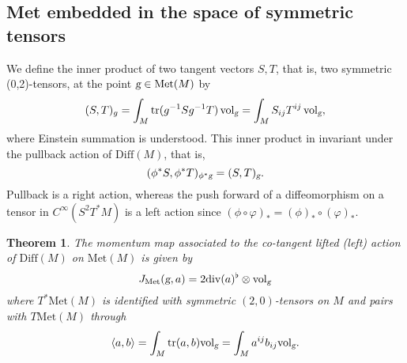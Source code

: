 \documentclass{article}
\theoremstyle{plain}
\newtheorem{teo}{Theorem}[section]
\theoremstyle{definition}
\newcommand{\g}{\ensuremath{\textsl{g}}}
\newcommand{\Diff}{\ensuremath{\mathrm{Diff}}}
\newcommand{\Met}{\ensuremath{\mathrm{Met}}}
\newcommand{\Div}{\ensuremath{\mathrm{div}}}
\newcommand{\Vol}{\ensuremath{\mathrm{vol}}}
\newcommand{\tr}{\ensuremath{\mathrm{tr}}}
\begin{document}
\subsection[Met embedded]{Met embedded in the space of symmetric tensors}
We define the inner product of two tangent vectors $S,T$, that is, two symmetric (0,2)-tensors, at the point $\g\in\Met(M)$ by
\[
(S,T)_g=\int_M \tr(g^{-1}Sg^{-1}T)\,\Vol_\g = \int_M S_{ij}T^{ij}\,\Vol_\g,
\]
where Einstein summation is understood. This inner product in invariant under the pullback action of $\Diff(M)$, that is,
\[
(\phi^*S,\phi^*T)_{\phi^*\g}=(S,T)_\g.
\]
Pullback is a right action, whereas the push forward of a diffeomorphism on a tensor in $C^\infty(S^2T^*M)$ is a left action since $(\phi\circ\varphi)_*=(\phi)_*\circ(\varphi)_*$. 

\begin{teo}
	The momentum map associated to  the co-tangent lifted (left) action  of $\Diff(M)$ on $\Met(M)$ is given by
	\[
	  J_\Met(\g,a)=2\Div (a)^\flat \otimes \Vol_\g  
	\]
	where $T^*\Met(M)$ is identified with  symmetric $(2,0)$-tensors on $M$ and  pairs with $T\Met(M)$ through
	\[
	\langle a,b\rangle = \int_M \tr (a,b)\Vol_\g=\int_M a^{ij}b_{ij}\Vol_\g.
	\]
\end{teo}
\end{document}
